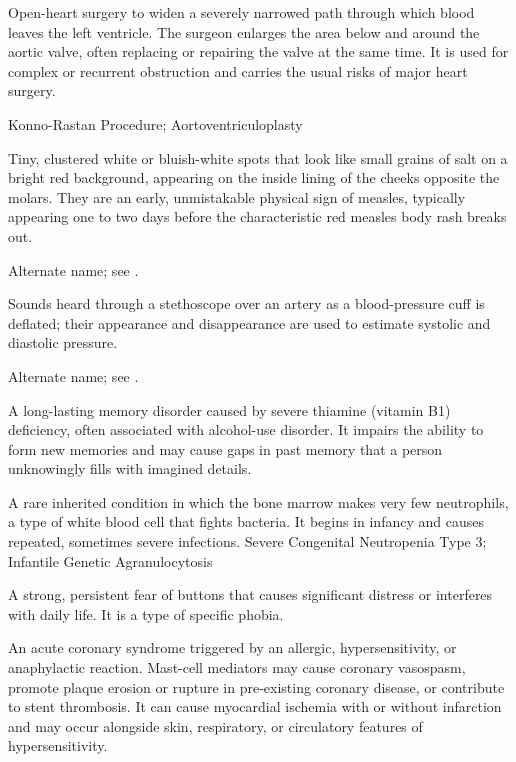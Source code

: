  Open-heart surgery to widen a severely narrowed path through which blood leaves the left ventricle. The surgeon enlarges the area below and around the aortic valve, often replacing or repairing the valve at the same time. It is used for complex or recurrent obstruction and carries the usual risks of major heart surgery.

\synonyms
Konno-Rastan Procedure; Aortoventriculoplasty

 Tiny, clustered white or bluish-white spots that look like small grains of salt on a bright red background, appearing on the inside lining of the cheeks opposite the molars. They are an early, unmistakable physical sign of measles, typically appearing one to two days before the characteristic red measles body rash breaks out.

 Alternate name; see .

 Sounds heard through a stethoscope over an artery as a blood-pressure cuff is deflated; their appearance and disappearance are used to estimate systolic and diastolic pressure.

 Alternate name; see .

 A long-lasting memory disorder caused by severe thiamine (vitamin B1) deficiency, often associated with alcohol-use disorder. It impairs the ability to form new memories and may cause gaps in past memory that a person unknowingly fills with imagined details.

 A rare inherited condition in which the bone marrow makes very few neutrophils, a type of white blood cell that fights bacteria. It begins in infancy and causes repeated, sometimes severe infections.
\synonyms
Severe Congenital Neutropenia Type 3; Infantile Genetic Agranulocytosis

 A strong, persistent fear of buttons that causes significant distress or interferes with daily life. It is a type of specific phobia.

 An acute coronary syndrome triggered by an allergic,
hypersensitivity, or anaphylactic reaction. Mast-cell mediators may cause coronary
vasospasm, promote plaque erosion or rupture in pre-existing coronary disease, or contribute
to stent thrombosis. It can cause myocardial ischemia with or without infarction and may
occur alongside skin, respiratory, or circulatory features of hypersensitivity.

